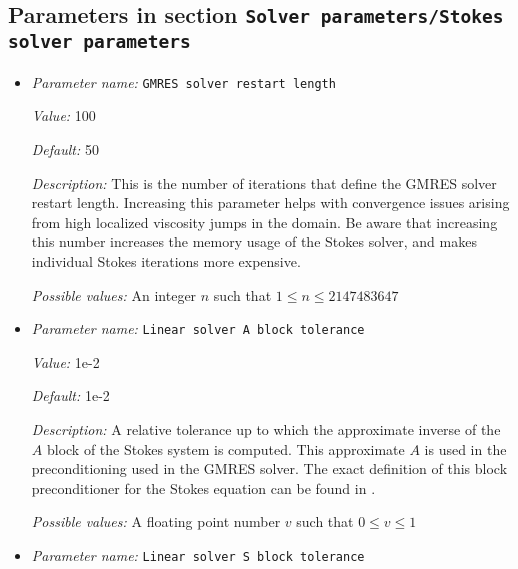 \subsection{Parameters in section \tt Solver parameters/Stokes solver parameters}
\label{parameters:Solver_20parameters/Stokes_20solver_20parameters}

\begin{itemize}
\item {\it Parameter name:} {\tt GMRES solver restart length}
\label{parameters:Solver parameters/Stokes solver parameters/GMRES solver restart length}
\label{parameters:Solver_20parameters/Stokes_20solver_20parameters/GMRES_20solver_20restart_20length}


{\it Value:} 100


{\it Default:} 50


{\it Description:} This is the number of iterations that define the GMRES solver restart length. Increasing this parameter helps with convergence issues arising from high localized viscosity jumps in the domain. Be aware that increasing this number increases the memory usage of the Stokes solver, and makes individual Stokes iterations more expensive.


{\it Possible values:} An integer $n$ such that $1\leq n \leq 2147483647$
\item {\it Parameter name:} {\tt Linear solver A block tolerance}
\label{parameters:Solver parameters/Stokes solver parameters/Linear solver A block tolerance}
\label{parameters:Solver_20parameters/Stokes_20solver_20parameters/Linear_20solver_20A_20block_20tolerance}


{\it Value:} 1e-2


{\it Default:} 1e-2


{\it Description:} A relative tolerance up to which the approximate inverse of the $A$ block of the Stokes system is computed. This approximate $A$ is used in the preconditioning used in the GMRES solver. The exact definition of this block preconditioner for the Stokes equation can be found in \cite{KHB12}.


{\it Possible values:} A floating point number $v$ such that $0 \leq v \leq 1$
\item {\it Parameter name:} {\tt Linear solver S block tolerance}
\label{parameters:Solver parameters/Stokes solver parameters/Linear solver S block tolerance}
\label{parameters:Solver_20parameters/Stokes_20solver_20parameters/Linear_20solver_20S_20block_20tolerance}



\end{itemize}
